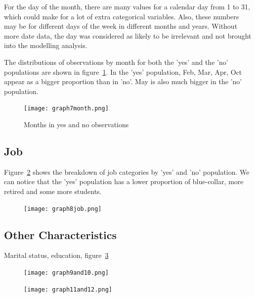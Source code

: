 \documentclass[9pt,technote]{IEEEtran}
\begin{document}
For the day of the month, there are many values for a calendar day from 1 to 31, which could make for a lot of extra categorical variables.  Also, these numbers may be for different days of the week in different months and years.  Without more date data, the day was considered as likely to be irrelevant and not brought into the modelling analysis.   

The distributions of observations by month for both the 'yes' and the 'no' populations are shown in 
figure~\ref{fig:graph7month}.  In the 'yes' population, Feb, Mar, Apr, Oct appear as a bigger proportion than in 'no'.  May is also much bigger in the 'no' population.  

\begin{figure}[htbp]
\centerline{\texttt{[image: graph7month.png]}}
\caption{Months in yes and no observations}
\label{fig:graph7month}
\end{figure}

\subsection{Job}

Figure~\ref{fig:graph8job} shows the breakdown of job categories by 'yes' and 'no' population.  We can notice that the 'yes' population has a lower proportion of blue-collar, more retired and some more students.   

\begin{figure}[htbp]
\centerline{\texttt{[image: graph8job.png]}}
\label{fig:graph8job}
\end{figure}

\subsection{Other Characteristics}

Marital status, education, figure~\ref{fig:graph9and10}


\begin{figure}[htbp]
\centerline{\texttt{[image: graph9and10.png]}}
\label{fig:graph9and10}
\end{figure}


\begin{figure}[htbp]
\centerline{\texttt{[image: graph11and12.png]}}
\label{fig:graph11and12}
\end{figure}
\end{document}
